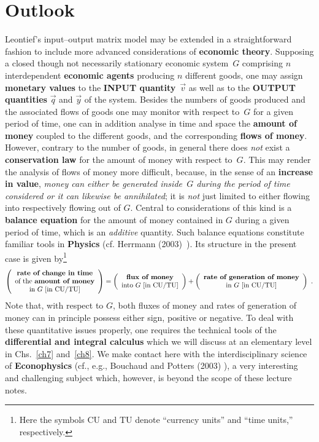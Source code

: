 \section[Outlook]%
{Outlook}
Leontief's input--output matrix model may be extended in a 
straightforward fashion to include more advanced considerations of 
{\bf economic theory}. Supposing a closed though not necessarily 
stationary economic system~$G$ comprising $n$ interdependent {\bf 
economic agents} producing $n$ different goods, one may assign 
{\bf monetary values} to the {\bf INPUT quantity}~$\vec{v}$ as 
well as to the {\bf OUTPUT quantities} $\vec{q}$ and $\vec{y}$ of 
the system. Besides the numbers of goods produced and the 
associated flows of goods one may monitor with respect to~$G$ for 
a given period of time, one can in addition analyse in time and 
space the {\bf amount of money} coupled to the different goods, 
and the corresponding {\bf flows of money}. However, contrary to 
the number of goods, in general there does \emph{not} exist a 
{\bf conservation law} for the amount of money with respect 
to~$G$. This may render the analysis of flows of money more 
difficult, because, in the sense of an {\bf increase in value}, 
\emph{money can either be generated inside~$G$ during the period 
of time considered or it can likewise be annihilated}; it is 
\emph{not} just limited to either flowing into respectively 
flowing out of $G$. Central to considerations of this kind is a 
{\bf balance equation} for the amount of money contained in $G$ 
during a given period of time, which is an \emph{additive} 
quantity. Such balance equations constitute familiar tools in {\bf 
Physics} (cf. Herrmann (2003)~). Its structure 
in the present case is given by\footnote{Here the symbols CU and 
TU denote ``currency units'' and ``time units,'' respectively.} 
%
\[
\left(\begin{array}{c}
\text{{\bf rate\ of\ change\ in\ time}} \\
\text{of\ the\ {\bf amount of money}}\\
\text{in}\ G\ \text{[in CU/TU]}
\end{array}\right)
= \left(\begin{array}{c}
\text{{\bf flux of money}} \\
\text{into}\ G\ \text{[in CU/TU]}
\end{array}\right)
+ \left(\begin{array}{c}
\text{{\bf rate of generation of money}} \\
\text{in}\ G\ \text{[in CU/TU]}
\end{array}\right) \ .
\]
%
Note that, with respect to $G$, both fluxes of money and rates of 
generation of money can in principle possess either sign, positive 
or negative. To deal with these quantitative issues properly, one 
requires the technical tools of the {\bf differential and integral 
calculus} which we will discuss at an elementary level in 
Chs.~\ref{ch7} and~\ref{ch8}. We make contact here with the 
interdisciplinary science of {\bf Econophysics} (cf., e.g., 
Bouchaud and Potters (2003) ), a very interesting 
and challenging subject which, however, is beyond the scope of 
these lecture notes.


